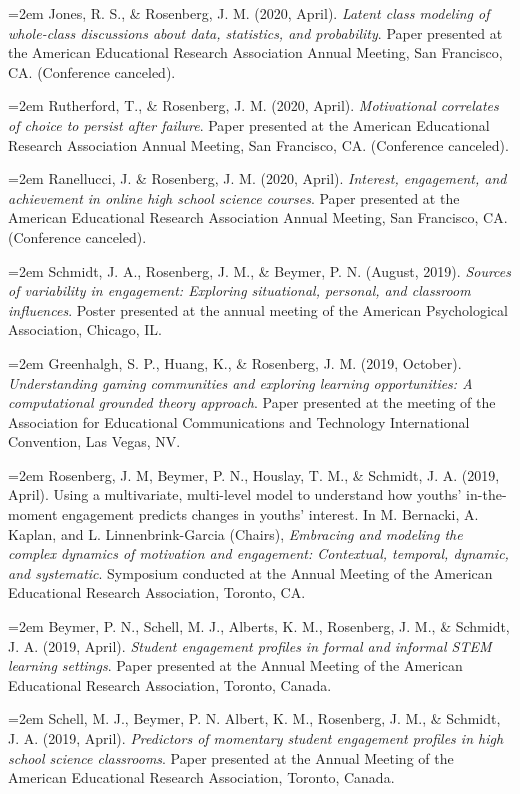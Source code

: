 \documentclass[
  14,
]{article}
\begin{document}
\hangindent=2em Jones, R. S., \& Rosenberg, J. M. (2020, April).
\emph{Latent class modeling of whole-class discussions about data,
statistics, and probability}. Paper presented at the American
Educational Research Association Annual Meeting, San Francisco, CA.
(Conference canceled).

\hangindent=2em Rutherford, T., \& Rosenberg, J. M. (2020, April).
\emph{Motivational correlates of choice to persist after failure}. Paper
presented at the American Educational Research Association Annual
Meeting, San Francisco, CA. (Conference canceled).

\hangindent=2em Ranellucci, J. \& Rosenberg, J. M. (2020, April).
\emph{Interest, engagement, and achievement in online high school
science courses}. Paper presented at the American Educational Research
Association Annual Meeting, San Francisco, CA. (Conference canceled).

\hangindent=2em Schmidt, J. A., Rosenberg, J. M., \& Beymer, P. N.
(August, 2019). \emph{Sources of variability in engagement: Exploring
situational, personal, and classroom influences}. Poster presented at
the annual meeting of the American Psychological Association, Chicago,
IL.

\hangindent=2em Greenhalgh, S. P., Huang, K., \& Rosenberg, J. M. (2019,
October). \emph{Understanding gaming communities and exploring learning
opportunities: A computational grounded theory approach}. Paper
presented at the meeting of the Association for Educational
Communications and Technology International Convention, Las Vegas, NV.

\hangindent=2em Rosenberg, J. M, Beymer, P. N., Houslay, T. M., \&
Schmidt, J. A. (2019, April). Using a multivariate, multi-level model to
understand how youths' in-the-moment engagement predicts changes in
youths' interest. In M. Bernacki, A. Kaplan, and L. Linnenbrink-Garcia
(Chairs), \emph{Embracing and modeling the complex dynamics of
motivation and engagement: Contextual, temporal, dynamic, and
systematic}. Symposium conducted at the Annual Meeting of the American
Educational Research Association, Toronto, CA.

\hangindent=2em Beymer, P. N., Schell, M. J., Alberts, K. M., Rosenberg,
J. M., \& Schmidt, J. A. (2019, April). \emph{Student engagement
profiles in formal and informal STEM learning settings}. Paper presented
at the Annual Meeting of the American Educational Research Association,
Toronto, Canada.

\hangindent=2em Schell, M. J., Beymer, P. N. Albert, K. M., Rosenberg,
J. M., \& Schmidt, J. A. (2019, April). \emph{Predictors of momentary
student engagement profiles in high school science classrooms}. Paper
presented at the Annual Meeting of the American Educational Research
Association, Toronto, Canada.
\end{document}
